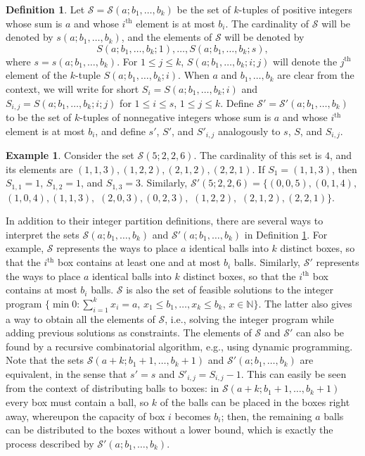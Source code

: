\documentclass[11pt]{article}
\theoremstyle{definition}
\newtheorem{definition}{Definition}
\newtheorem{example}{Example}
\newcommand{\1}{\vspace{0.1cm}}
\newcommand{\2}{\vspace{0.2cm}}
\newcommand{\3}{\vspace{0.3cm}}
\begin{document}
\begin{definition}
\label{definition_tuples}
Let $\mathcal{S}=\mathcal{S}(a;b_1,\ldots,b_k)$ be the set of $k$-tuples of positive integers whose sum is $a$ and whose $i^\text{th}$ element is at most $b_i$. The cardinality of $\mathcal{S}$ will be denoted by $s(a;b_1,\ldots, b_k)$, and the elements of $\mathcal{S}$ will be denoted by 
\[S(a;b_1,\ldots,b_k;1),\ldots, S(a;b_1,\ldots,b_k;s),\] where $s=s(a;b_1,\ldots, b_k)$. For $1\leq j\leq k$, $S(a;b_1,\ldots,b_k;i;j)$ will denote the $j^\text{th}$ element of the $k$-tuple $S(a;b_1,\ldots,b_k;i)$. When $a$ and $b_1,\ldots,b_k$ are clear from the context, we will write for short $S_i=S(a;b_1,\ldots,b_k;i)$ and $S_{i,j}=S(a;b_1,\ldots,b_k;i;j)$ for $1\leq i\leq s$, $1\leq j\leq k$. 
Define $\mathcal{S}'=\mathcal{S}'(a;b_1,\ldots,b_k)$ to be the set of $k$-tuples of nonnegative integers whose sum is $a$ and whose $i^\text{th}$ element is at most $b_i$, and define $s'$, $S'$, and $S'_{i,j}$ analogously to $s$, $S$, and $S_{i,j}$.
\end{definition}
\begin{example}
Consider the set $\mathcal{S}(5;2,2,6)$. The cardinality of this set is $4$, and its elements are $(1,1,3),(1,2,2),(2,1,2),(2,2,1)$. If $S_1=(1,1,3)$, then $S_{1,1}=1$, $S_{1,2}=1$, and $S_{1,3}=3$. Similarly, $\mathcal{S}'(5;2,2,6)=\{(0,0,5),(0,1,4),$ $(1,0,4),(1,1,3),$ $(2,0,3),(0,2,3),$ $(1,2,2),$ $(2,1,2),(2,2,1)\}$.
\end{example}

In addition to their integer partition definitions, there are several ways to interpret the sets $\mathcal{S}(a;b_1,\ldots,b_k)$ and $\mathcal{S}'(a;b_1,\ldots,b_k)$ in Definition \ref{definition_tuples}. For example, $\mathcal{S}$ represents the ways to place $a$ identical balls into $k$ distinct boxes, so that the $i^\text{th}$ box contains at least one and at most $b_i$ balls. Similarly, $\mathcal{S}'$ represents the ways to place $a$ identical balls into $k$ distinct boxes, so that the $i^\text{th}$ box contains at most $b_i$ balls. $\mathcal{S}$ is also the set of feasible solutions to the integer program $\{\min 0 :\sum_{i=1}^k x_i=a$, $x_1\leq b_1,\ldots,x_k\leq b_k$, $x\in \mathbb{N}\}$. The latter also gives a way to obtain all the elements of $\mathcal{S}$, i.e., solving the integer program while adding previous solutions as constraints. The elements of $\mathcal{S}$ and $\mathcal{S}'$ can also be found by a recursive combinatorial algorithm, e.g., using dynamic programming. Note that the sets $\mathcal{S}(a+k;b_1+1,\ldots,b_k+1)$ and $\mathcal{S}'(a;b_1,\ldots,b_k)$ are equivalent, in the sense that $s'=s$ and $S'_{i,j}=S_{i,j}-1$. This can easily be seen from the context of distributing balls to boxes: in $\mathcal{S}(a+k;b_1+1,\ldots,b_k+1)$ every box must contain a ball, so $k$ of the balls can be placed in the boxes right away, whereupon the capacity of box $i$ becomes $b_i$; then, the remaining $a$ balls can be distributed to the boxes without a lower bound, which is exactly the process described by $\mathcal{S}'(a;b_1,\ldots,b_k)$.
\end{document}
